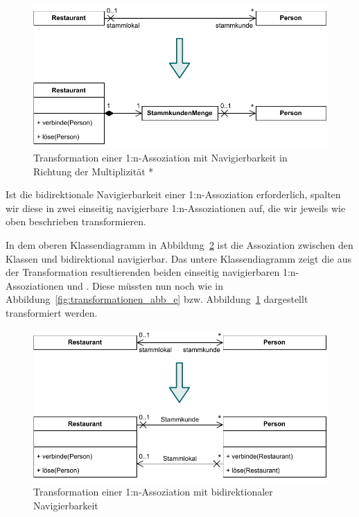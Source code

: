 \begin{figure}[h!]
	\centering
	\includegraphics[scale=1.0]{Bilder/Kapitel-9/transformationen_abb_f.pdf}
	\vspace{\baselineskip} %
	\caption{Transformation einer 1:n-Assoziation mit Navigierbarkeit in Richtung der Multiplizität *}
	\label{fig:transformationen_abb_f}
\end{figure}

\pagebreak %


\vspace{2mm} %

Ist die bidirektionale Navigierbarkeit einer 1:n-Assoziation erforderlich, spalten wir diese in zwei einseitig navigierbare 1:n-Assoziationen auf, die wir jeweils wie oben beschrieben transformieren.

\vspace{2mm} %

In dem oberen Klassendiagramm in Abbildung~\ref{fig:transformationen_abb_g} ist die Assoziation zwischen den Klassen  und  bidirektional navigierbar. Das untere Klassen\-diagramm zeigt die aus der Transformation resultierenden beiden einseitig navigierbaren 1:n-As\-so\-zi\-a\-ti\-o\-nen  und . Diese müssten nun noch wie in Abbildung~\ref{fig:transformationen_abb_e} bzw. Abbildung~\ref{fig:transformationen_abb_f} dargestellt transformiert werden.

\begin{figure}[h!]
	\centering
	\includegraphics[scale=1.0]{Bilder/Kapitel-9/transformationen_abb_g.pdf}
	\vspace{\baselineskip} %
	\caption{Transformation einer 1:n-Assoziation mit bidirektionaler Navigierbarkeit}
	\label{fig:transformationen_abb_g}
\end{figure}

